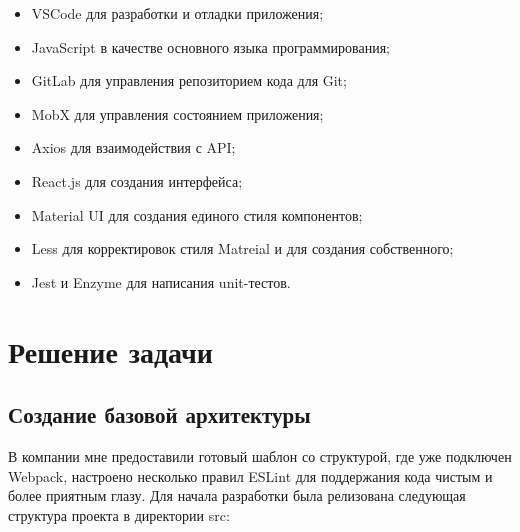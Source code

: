 \documentclass[a4paper,12pt]{diplom}
\begin{document}
\begin{itemize}
  \item VSCode для разработки и отладки приложения;
  \item JavaScript в качестве основного языка программирования;
  \item GitLab для управления репозиторием кода для Git;
  \item MobX для управления состоянием приложения;
  \item Axios для взаимодействия с API;
  \item React.js для создания интерфейса;
  \item Material UI для создания единого стиля компонентов;
  \item Less для корректировок стиля Matreial и для создания собственного;
  \item Jest и Enzyme для написания unit-тестов.
\end{itemize}

\chapter{Решение задачи}

\section{Создание базовой архитектуры}
В компании мне предоставили готовый шаблон со структурой, где уже подключен Webpack, настроено несколько правил ESLint для поддержания кода чистым и более приятным глазу.
Для начала разработки была релизована следующая структура проекта в директории src:

\medskip

\renewcommand*\DTstyle{\ttfamily\textcolor{black}}
\end{document}
